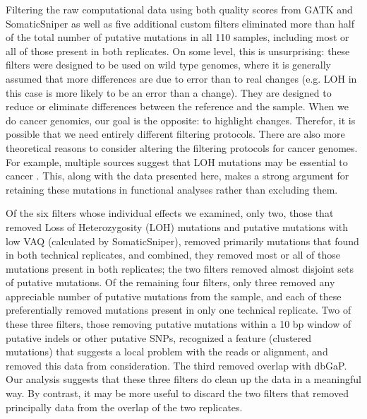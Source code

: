 \documentclass[11pt]{article} %
\begin{document}
Filtering the raw computational data using both quality scores from GATK and SomaticSniper as well as five additional custom filters eliminated more than half of the total number of putative mutations in all 110 samples, including most or all of those present in both replicates. On some level, this is unsurprising: these filters were designed to be used on wild type genomes, where it is generally assumed that more differences are due to error than to real changes (e.g. LOH in this case is more likely to be an error than a change). They are designed to reduce or eliminate differences between the reference and the sample. When we do cancer genomics, our goal is the opposite: to highlight changes. Therefor, it is possible that we need entirely different filtering protocols. There are also more theoretical reasons to consider altering the filtering protocols for cancer genomes. For example, multiple sources suggest that LOH mutations may be essential to cancer \citep{LOH}. This, along with the data presented here, makes a strong argument for retaining these mutations in functional analyses rather than excluding them.

Of the six filters whose individual effects we examined, only two, those that removed Loss of Heterozygosity (LOH) mutations and putative mutations with low VAQ (calculated by SomaticSniper), removed primarily mutations that found in both technical replicates, and combined, they removed most or all of those mutations present in both replicates; the two filters removed almost disjoint sets of putative mutations. Of the remaining four filters, only three removed any appreciable number of putative mutations from the sample, and each of these preferentially removed mutations present in only one technical replicate. Two of these three filters, those removing putative mutations within a 10 bp window of putative indels or other putative SNPs, recognized a feature (clustered mutations) that suggests a local problem with the reads or alignment, and removed this data from consideration. The third removed overlap with dbGaP.  Our analysis suggests that these three filters do clean up the data in a meaningful way. By contrast, it may be more useful to discard the two filters that removed principally data from the overlap of the two replicates.
\end{document}
